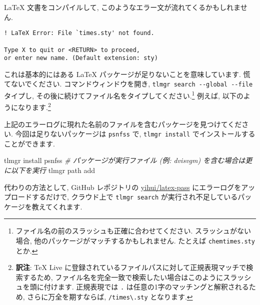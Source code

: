 \documentclass[
  xelatex,ja=standard,jafont=noto]{bxjsreport}
\newenvironment{Shaded}{\begin{snugshade}}{\end{snugshade}}
\newcommand{\AttributeTok}[1]{\textcolor[rgb]{0.77,0.63,0.00}{#1}}
\newcommand{\CommentTok}[1]{\textcolor[rgb]{0.56,0.35,0.01}{\textit{#1}}}
\newcommand{\ExtensionTok}[1]{#1}
\newcommand{\NormalTok}[1]{#1}
\newcommand{\StringTok}[1]{\textcolor[rgb]{0.31,0.60,0.02}{#1}}
\begin{document}
LaTeX 文書をコンパイルして,
このようなエラー文が流れてくるかもしれません.

\begin{verbatim}
! LaTeX Error: File `times.sty' not found.

Type X to quit or <RETURN> to proceed,
or enter new name. (Default extension: sty)
\end{verbatim}

これは基本的にはある LaTeX パッケージが足りないことを意味しています.
慌てないでください. コマンドウィンドウを開き,
\texttt{tlmgr\ search\ -\/-global\ -\/-file} タイプし,
その後に続けてファイル名をタイプしてください.\footnote{ファイル名の前のスラッシュも正確に合わせてください.
  スラッシュがない場合, 他のパッケージがマッチするかもしれません.
  たとえば \texttt{chemtimes.sty} とか.} 例えば,
以下のようになります.\footnote{\textbf{訳注}: TeX Live
  に登録されているファイルパスに対して正規表現マッチで検索するため,
  ファイル名を完全一致で検索したい場合はこのようにスラッシュを頭に付けます.
  正規表現では \texttt{.} は任意の1字のマッチングと解釈されるため,
  さらに万全を期すならば, \texttt{/times\textbackslash{}.sty}
  となります.}

\begin{Shaded}
\end{Shaded}

上記のエラーログに現れた名前のファイルを含むパッケージを見つけてください.
今回は足りないパッケージは \texttt{psnfss} で, \texttt{tlmgr\ install}
でインストールすることができます.

\begin{Shaded}
\begin{Highlighting}[]
\ExtensionTok{tlmgr}\NormalTok{ install psnfss}
\CommentTok{\# パッケージが実行ファイル (例: dvisvgm) を含む場合は更に以下を実行}
\ExtensionTok{tlmgr}\NormalTok{ path add}
\end{Highlighting}
\end{Shaded}

代わりの方法として, GitHub レポジトリの
\href{https://github.com/yihui/latex-pass}{yihui/latex-pass}
にエラーログをアップロードするだけで, クラウド上で
\texttt{tlmgr\ search} が実行され不足しているパッケージを教えてくれます.
\end{document}
